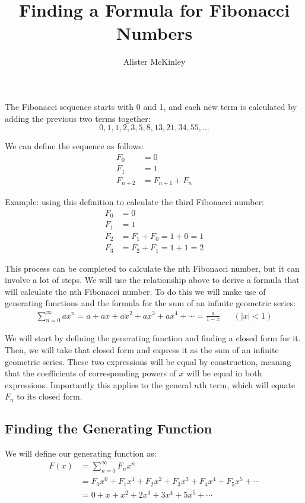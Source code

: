 \documentclass{article}
\title{Finding a Formula for Fibonacci Numbers}
\author{Alister McKinley}
\date{}
\begin{document}
\maketitle

\section*{}
The Fibonacci sequence starts with 0 and 1, and each new term is calculated by
adding the previous two terms together:
\[ 0, 1, 1, 2, 3, 5, 8, 13, 21, 34, 55, \dots \]

We can define the sequence as follows:
\[\begin{aligned}
    F_0 &= 0 \\
    F_1 &= 1 \\
    F_{n+2} &= F_{n+1} + F_n
\end{aligned}\]

Example: using this definition to calculate the third Fibonacci number:
\[\begin{aligned}
    F_0 &= 0 \\
    F_1 &= 1 \\
    F_2 &= F_1 + F_0 = 1 + 0 = 1 \\
    F_3 &= F_2 + F_1 = 1 + 1 = 2
\end{aligned}\]

This process can be completed to calculate the nth Fibonacci number, but it can
involve a lot of steps. We will use the relationship above to derive a formula
that will calculate the nth Fibonacci number. To do this we will make use of
generating functions and the formula for the sum of an infinite geometric
series:
\[\begin{aligned}
    \sum_{n=0}^\infty ax^n = a + ax + ax^2 + ax^3 + ax^4 + \cdots
        = \frac{a}{1-x} && (|x| < 1)
\end{aligned}\]

We will start by defining the generating function and finding a closed form for
it. Then, we will take that closed form and express it as the sum of an infinite
geometric series. These two expressions will be equal by construction, meaning
that the coefficients of corresponding powers of \(x\) will be equal in both
expressions. Importantly this applies to the general \(n\)th term, which will
equate \(F_n\) to its closed form.

\subsection*{Finding the Generating Function}
We will define our generating function as:
\[\begin{aligned} F(x) &= \sum_{n=0}^\infty F_nx^n \\
    &= F_0x^0 + F_1x^1 + F_2x^2 + F_3x^3 + F_4x^4 + F_5x^5 + \cdots \\
    &= 0 + x + x^2 + 2x^3 + 3x^4 + 5x^5 + \cdots
\end{aligned}\]
\end{document}

